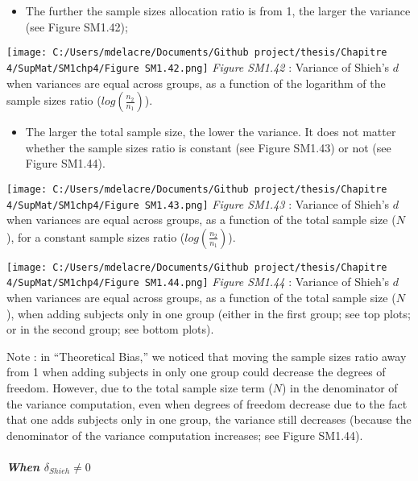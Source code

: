 \documentclass[
  english,
  man,mask,floatsintext]{apa6}
\providecommand{\tightlist}{%
  \setlength{\itemsep}{0pt}\setlength{\parskip}{0pt}}
\let\oldsubparagraph\subparagraph
\renewcommand{\subparagraph}[1]{\oldsubparagraph{#1}\mbox{}}
\begin{document}
\newpage

\begin{itemize}
\tightlist
\item
  The further the sample sizes allocation ratio is from 1, the larger the variance (see Figure SM1.42);
\end{itemize}

\texttt{[image: C:/Users/mdelacre/Documents/Github project/thesis/Chapitre 4/SupMat/SM1chp4/Figure SM1.42.png]}
\emph{Figure SM1.42} : Variance of Shieh's \(d\) when variances are equal across groups, as a function of the logarithm of the sample sizes ratio (\(log\left(\frac{n_2}{n_1} \right)\)).

\newpage

\begin{itemize}
\tightlist
\item
  The larger the total sample size, the lower the variance. It does not matter whether the sample sizes ratio is constant (see Figure SM1.43) or not (see Figure SM1.44).
\end{itemize}

\texttt{[image: C:/Users/mdelacre/Documents/Github project/thesis/Chapitre 4/SupMat/SM1chp4/Figure SM1.43.png]}
\emph{Figure SM1.43} : Variance of Shieh's \(d\) when variances are equal across groups, as a function of the total sample size (\(N\)), for a constant sample sizes ratio (\(log\left(\frac{n_2}{n_1} \right)\)).

\newpage

\texttt{[image: C:/Users/mdelacre/Documents/Github project/thesis/Chapitre 4/SupMat/SM1chp4/Figure SM1.44.png]}
\emph{Figure SM1.44} : Variance of Shieh's \(d\) when variances are equal across groups, as a function of the total sample size (\(N\)), when adding subjects only in one group (either in the first group; see top plots; or in the second group; see bottom plots).

Note : in ``Theoretical Bias,'' we noticed that moving the sample sizes ratio away from 1 when adding subjects in only one group could decrease the degrees of freedom. However, due to the total sample size term (\(N\)) in the denominator of the variance computation, even when degrees of freedom decrease due to the fact that one adds subjects only in one group, the variance still decreases (because the denominator of the variance computation increases; see Figure SM1.44).

\hypertarget{when-delta_shieh-neq-0}{%
\subparagraph{\texorpdfstring{When \(\delta_{Shieh} \neq 0\)}{When \textbackslash delta\_\{Shieh\} \textbackslash neq 0}}\label{when-delta_shieh-neq-0}}
\end{document}
